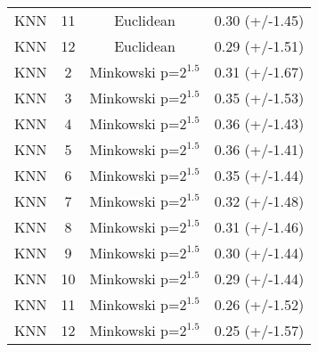 \documentclass{article}
\begin{document}
\begin{tabular}{cccc}
            KNN &         11 &              Euclidean &  0.30 (+/-1.45) \\
            KNN &         12 &              Euclidean &  0.29 (+/-1.51) \\
            KNN &          2 &  Minkowski p=$2^{1.5}$ &  0.31 (+/-1.67) \\
            KNN &          3 &  Minkowski p=$2^{1.5}$ &  0.35 (+/-1.53) \\
            KNN &          4 &  Minkowski p=$2^{1.5}$ &  0.36 (+/-1.43) \\
            KNN &          5 &  Minkowski p=$2^{1.5}$ &  0.36 (+/-1.41) \\
            KNN &          6 &  Minkowski p=$2^{1.5}$ &  0.35 (+/-1.44) \\
            KNN &          7 &  Minkowski p=$2^{1.5}$ &  0.32 (+/-1.48) \\
            KNN &          8 &  Minkowski p=$2^{1.5}$ &  0.31 (+/-1.46) \\
            KNN &          9 &  Minkowski p=$2^{1.5}$ &  0.30 (+/-1.44) \\
            KNN &         10 &  Minkowski p=$2^{1.5}$ &  0.29 (+/-1.44) \\
            KNN &         11 &  Minkowski p=$2^{1.5}$ &  0.26 (+/-1.52) \\
            KNN &         12 &  Minkowski p=$2^{1.5}$ &  0.25 (+/-1.57) \\
            \bottomrule
          \end{tabular}
\end{document}
